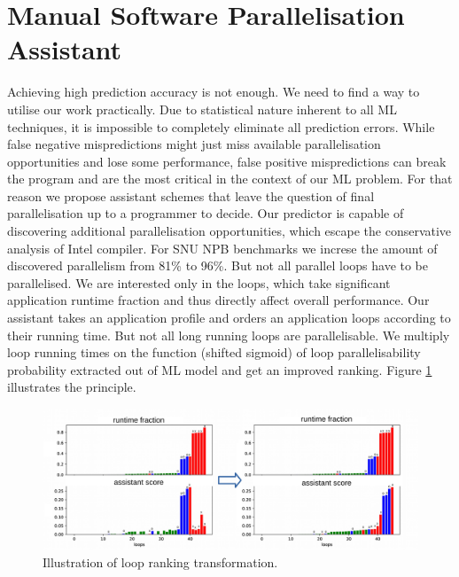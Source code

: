 \documentclass{acaces}
\begin{document}
\section{Manual Software Parallelisation Assistant}
\label{assistant-scheme}
\quad Achieving high prediction accuracy is not enough. We need to find a way to utilise our work practically. Due to statistical nature inherent to all ML techniques, it is impossible to completely eliminate all prediction errors. While false negative mispredictions might just miss available parallelisation opportunities and lose some performance, false positive mispredictions can break the program and are the most critical in the context of our ML problem. For that reason we propose assistant schemes that leave the question of final parallelisation up to a programmer to decide.\newline\null
\quad Our predictor is capable of discovering additional parallelisation opportunities, which escape the conservative analysis of Intel compiler. For SNU NPB benchmarks we increse the amount of discovered parallelism from 81\% to 96\%. But not all parallel loops have to be parallelised. We are interested only in the loops, which take significant application runtime fraction and thus directly affect overall performance. Our assistant takes an application profile and orders an application loops according to their running time. But not all long running loops are parallelisable. We multiply loop running times on the function (shifted sigmoid) of loop parallelisability probability extracted out of ML model and get an improved ranking. Figure \ref{ranking} illustrates the principle.
\begin{figure}
\centering
\includegraphics[width=1.0\textwidth]{ft_ranking}
\caption{Illustration of loop ranking transformation.}
\label{ranking}
\end{figure}
\end{document}
